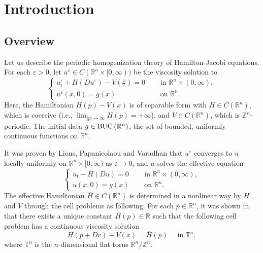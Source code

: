 \documentclass[12pt,reqno]{amsart}
\theoremstyle{plain}
\theoremstyle{remark}
\numberwithin{equation}{section}
\newcommand{\R}{\mathbb{R}}
\newcommand{\T}{\mathbb{T}}
\newcommand{\Z}{\mathbb{Z}}
\newcommand{\BUC}{{\rm BUC\,}}
\newcommand{\ep}{\varepsilon}
\newcommand{\ol}{\overline}
\begin{document}
\section{Introduction}

\subsection{Overview}
Let us describe the periodic homogenization theory of Hamilton-Jacobi equations.
For each $\ep>0$, let $u^\ep \in C(\R^n \times [0,\infty))$ be the viscosity solution to
\begin{equation}\label{HJ-ep}
\begin{cases}
u^\ep_t + H(Du^\ep) - V\left(\frac{x}{\ep}\right)=0 \quad &\text{ in } \R^n \times (0,\infty),\\
u^\ep(x,0)=g(x) \quad &\text{ on } \R^n.
\end{cases}
\end{equation}
Here, the Hamiltonian $H(p) -V(x)$ is of separable form with $H \in C(\R^n)$, which is coercive (i.e., $\lim_{|p| \to \infty} H(p)=+\infty$),
and $V \in C(\R^n)$, which is $\Z^n$-periodic.
The initial data $g\in \BUC(\R^n)$, the set of bounded, uniformly continuous functions on $\R^n$.

It was proven by Lions, Papanicolaou and Varadhan \cite{LPV} that $u^\ep$ converges to $u$ locally uniformly on $\R^n \times [0,\infty)$ as $\ep \to 0$,
and $u$ solves the effective equation
\begin{equation}\label{HJ-hom}
\begin{cases}
u_t +\ol{H}(Du)=0 \quad &\text{ in } \R^n \times (0,\infty),\\
u(x,0)=g(x) \quad &\text{ on } \R^n.
\end{cases}
\end{equation}
The effective Hamiltonian $\ol{H} \in C(\R^n)$ is determined in a nonlinear way by $H$ and $V$ through the cell problems as following.  
For each $p \in \R^n$, it was shown in \cite{LPV} that there exists a unique constant $\ol H(p)\in \R$ such that the following cell problem has a continuous viscosity solution
\begin{equation} \label{E-p}
H(p+Dv) - V(x) = \ol H(p) \quad \text{ in } \T^n,
\end{equation}
where $\T^n$ is the $n$-dimensional flat torus $\R^n/\Z^n$.
\end{document}
